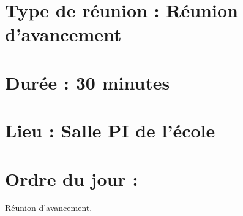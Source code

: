\documentclass[11pt]{meetingmins}
\begin{document}
\maketitle
\section{Type de réunion : \textnormal{Réunion d'avancement} }

\section{Durée : \textnormal{30 minutes} }
\section{Lieu : \textnormal{Salle PI de l'école} }


\section{}
\section{Ordre du jour :}
\begin{hiddenitems}

Réunion d'avancement.
\end{hiddenitems}
\end{document}
